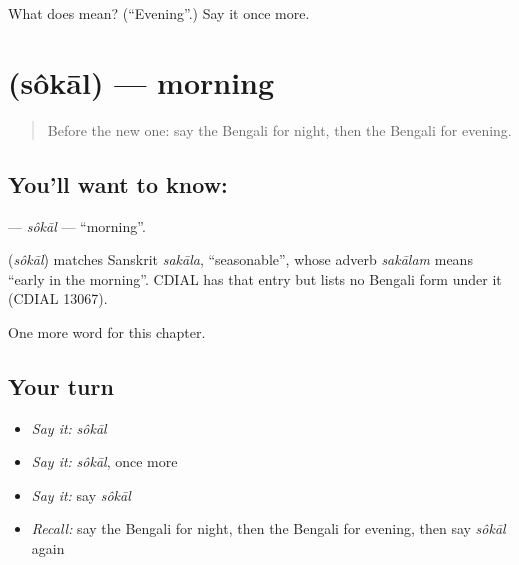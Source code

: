 \begin{tcolorbox}[breakable,colback=teal!4,colframe=teal!35!black,title={Before you move on}]
What does  mean? (\textquotedblleft{}Evening\textquotedblright{}.) Say it once more.
\end{tcolorbox}
\section[\texorpdfstring{\bn{সকাল} (sôkāl)}{সকাল (sôkāl)}]{ (sôkāl) — morning}

\label{lesson:BN-C78-sokal}



\begin{quote}
Before the new one: say the Bengali for night, then the Bengali for evening.
\end{quote}

\subsection*{You'll want to know: }
\textbf{} — \emph{sôkāl} — \textquotedblleft{}morning\textquotedblright{}.

\begin{cousinweb}
\textbf{} (\emph{sôkāl}) matches Sanskrit \emph{sakāla}, \textquotedblleft{}seasonable\textquotedblright{}, whose adverb \emph{sakālam} means \textquotedblleft{}early in the morning\textquotedblright{}. CDIAL has that entry but lists no Bengali form under it (CDIAL 13067).
\end{cousinweb}

\begin{grammarlens}[title={What you've built}]
One more word for this chapter.
\end{grammarlens}

\subsection*{Your turn}
\begin{itemize}
\raggedright
  \item \emph{Say it:} \emph{sôkāl}
  \item \emph{Say it:} \emph{sôkāl}, once more
  \item \emph{Say it:} say \emph{sôkāl}
  \item \emph{Recall:} say the Bengali for night, then the Bengali for evening, then say \emph{sôkāl} again
\end{itemize}

